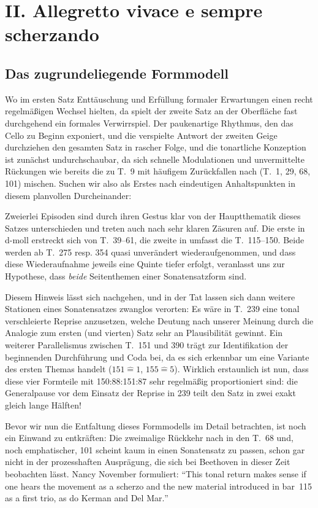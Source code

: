 \section{II. Allegretto vivace e sempre scherzando}

\subsection{Das zugrundeliegende Formmodell}
Wo im ersten Satz Enttäuschung und Erfüllung formaler Erwartungen
einen recht regelmäßigen Wechsel hielten, da spielt der zweite
Satz an der Oberfläche fast durchgehend ein formales Verwirrspiel.  Der
paukenartige Rhythmus, den das Cello zu Beginn exponiert, und die
verspielte Antwort der zweiten Geige durchziehen den gesamten Satz
in rascher Folge, und die tonartliche Konzeption ist zunächst
undurchschaubar, da sich schnelle Modulationen und unvermittelte
Rückungen wie bereits die zu T.~9 mit häufigem Zurückfallen nach
 (T.~1, 29, 68, 101) mischen.  Suchen wir also als
Erstes nach eindeutigen Anhaltspunkten in diesem planvollen
Durcheinander:

Zweierlei Episoden sind durch ihren Gestus klar von der
Hauptthematik dieses Satzes unterschieden und treten auch nach
sehr klaren Zäsuren auf.  Die erste in d-moll erstreckt sich von
T.~39–61, die zweite in  umfasst die T.~115–150.  Beide
werden ab T.~275 resp. 354 quasi unverändert wiederaufgenommen,
und dass diese Wiederaufnahme jeweils eine Quinte tiefer erfolgt,
veranlasst uns zur Hypothese, dass \emph{beide} Seitenthemen einer
Sonatensatzform sind.

Diesem Hinweis lässt sich nachgehen, und in der Tat lassen sich dann
weitere Stationen eines Sonatensatzes zwanglos verorten: Es wäre in
T.~239 eine tonal verschleierte Reprise anzusetzen, welche Deutung
nach unserer Meinung durch die Analogie zum ersten (und vierten) Satz sehr an
Plausibilität gewinnt.  Ein weiterer Parallelismus zwischen T.~151
und 390 trägt zur Identifikation der beginnenden Durchführung und
Coda bei, da es sich erkennbar um eine Variante des ersten Themas
handelt ($151\widehat{=}1$, $155\widehat{=}5$).  Wirklich erstaunlich
ist nun, dass diese vier Formteile mit \mbox{150:88:151:87} sehr regelmäßig
proportioniert sind: die Generalpause vor dem Einsatz der Reprise in
239 teilt den Satz in zwei exakt gleich lange Hälften!

Bevor wir nun die Entfaltung dieses Formmodells im Detail betrachten,
ist noch ein Einwand zu entkräften: Die zweimalige Rückkehr nach 
in den T.~68 und, noch emphatischer, 101 scheint kaum in einen Sonatensatz
zu passen, schon gar nicht in der prozesshaften Ausprägung, die sich
bei Beethoven in dieser Zeit beobachten lässt.  Nancy November formuliert:
\foreignquote{english}{This tonal return makes sense if one
hears the movement as a scherzo and the new material introduced in bar~115
as a first trio, as do Kerman and Del Mar.}\cite[p.~65]{november}


